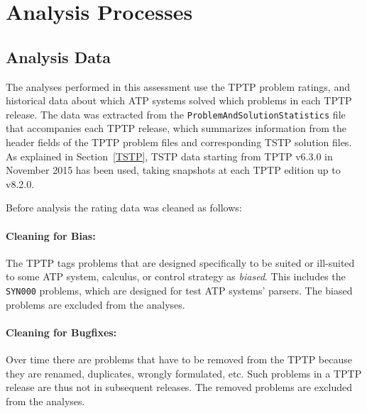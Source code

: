 \documentclass[runningheads]{llncs}
\begin{document}
\section{Analysis Processes}
\label{AnalysisProcesses}

\subsection{Analysis Data}
\label{AnalysisData}

The analyses performed in this assessment use the TPTP problem ratings, and historical data about 
which ATP systems solved which problems in each TPTP release.
The data was extracted from the {\tt ProblemAndSolutionStatistics} file that accompanies each TPTP 
release, which summarizes information from the header fields of the TPTP problem files and
corresponding TSTP solution files.
As explained in Section~\ref{TSTP}, TSTP data starting from TPTP v6.3.0 in November 2015 has been
used, taking snapshots at each TPTP edition up to v8.2.0.

Before analysis the rating data was cleaned as follows:

\paragraph{Cleaning for Bias:}
The TPTP tags problems that are designed specifically to be suited or ill-suited to some ATP 
system, calculus, or control strategy as {\em biased}. 
This includes the {\tt SYN000} problems, which are designed for test ATP systems' parsers.
The biased problems are excluded from the analyses.

\paragraph{Cleaning for Bugfixes:}
Over time there are problems that have to be removed from the TPTP because they are renamed,
duplicates, wrongly formulated, etc.
Such problems in a TPTP release are thus not in subsequent releases.
The removed problems are excluded from the analyses.
\end{document}
